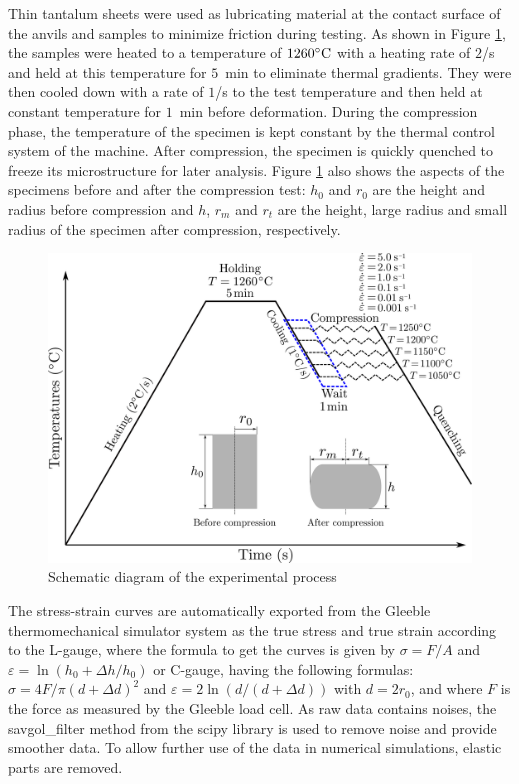 \documentclass[twoside,english,1p,final,sort&compress]{elsarticle}
\theoremstyle{plain}
\begin{document}
Thin tantalum sheets were used as lubricating material at the contact surface of the anvils and samples to minimize friction during testing.
As shown in Figure \ref{fig:GleebleProcess}, the samples were heated to a temperature of $1260\celsius$ with a heating rate of $2$\celsius/s and held at this temperature for $5$~min to eliminate thermal gradients.
They were then cooled down with a rate of $1$\celsius/s to the test temperature and then held at constant temperature for $1$~min before deformation.
During the compression phase, the temperature of the specimen is kept constant by the thermal control system of the machine.
After compression, the specimen is quickly quenched to freeze its microstructure for later analysis.
Figure \ref{fig:GleebleProcess} also shows the aspects of the specimens before and after the compression test: $h_0$ and $r_0$ are the height and radius before compression and $h$, $r_m$ and $r_t$ are the height, large radius and small radius of the specimen after compression, respectively.
\begin{figure}[!ht]
\centering
\includegraphics[width=0.8\columnwidth]{Figures/GleebleProcess}
\caption{Schematic diagram of the experimental process}
\label{fig:GleebleProcess}
\end{figure}

The stress-strain curves are automatically exported from the Gleeble thermomechanical simulator system as the true stress and true strain according to the L-gauge, where the formula to get the curves is given by $\sigma=F/A$ and $\varepsilon=\ln\left(h_0+\Delta h / h_0\right)$ or C-gauge, having the following formulas: $\sigma = 4F/\pi(d+\Delta d)^2$ and $\varepsilon = 2\ln\left(d/(d+\Delta d)\right)$ with $d = 2r_0$, and where $F$ is the force as measured by the Gleeble load cell.
As raw data contains noises, the savgol\_filter method from the scipy library is used to remove noise and provide smoother data.
To allow further use of the data in numerical simulations, elastic parts are removed.
\end{document}
